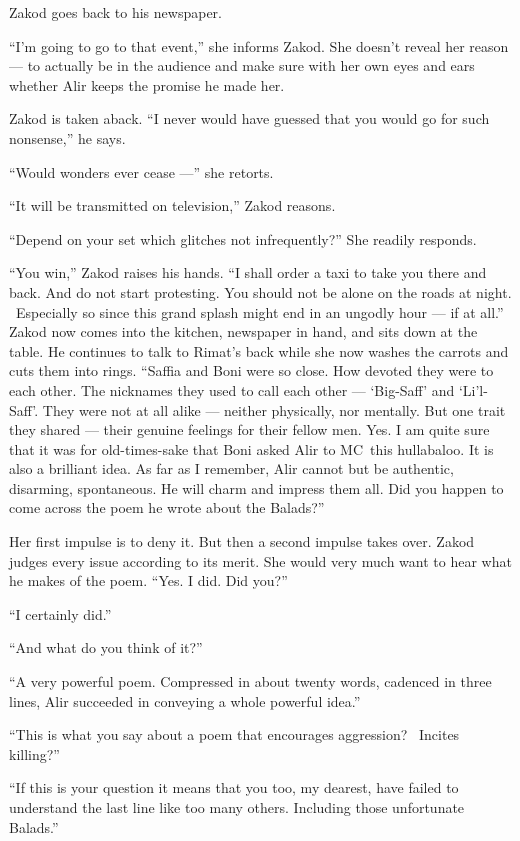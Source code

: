 \documentclass[twoside,11pt]{book}
\begin{document}
Zakod goes back to his newspaper.

``I'm going to go to that event,'' she informs Zakod. She doesn't reveal her reason --- to
actually be in the audience and make sure with her own eyes and ears whether Alir keeps  the promise he made
her.{ }

Zakod is taken aback. ``I never would have guessed that you would go for such nonsense,'' he says.

``Would wonders ever cease ---'' she retorts.

``It will be transmitted on television,'' Zakod reasons.

``Depend on your set which glitches not infrequently?'' She readily responds.

``You win,'' Zakod raises his hands. ``I shall order a taxi to take you there and
back. And do not start protesting. You should not be alone on the roads at night. ~Especially so since this grand
splash might end in an ungodly hour --- if at all.'' Zakod now comes into the kitchen, newspaper in hand,
and sits down at the table. He continues to talk to Rimat's back while she now washes the carrots and cuts them into
rings. ``Saffia and Boni were so close.  How devoted they were to each other{.}  The
nicknames they used to call each other --- `Big-Saff' and `Li'l-Saff'. They were not at all alike --- neither physically,
nor mentally. But one trait they shared --- their genuine feelings for their
fellow men. Yes. I am quite sure that it was for old-times-sake that Boni asked Alir to MC~this hullabaloo. It is
also a brilliant idea. As far as I remember, Alir cannot but be authentic, disarming, spontaneous. He will charm and
impress them all. Did you happen to come across the poem he wrote about the Balads?''

Her first impulse is to deny it. But then a second impulse takes over. Zakod judges every issue according to its merit.
She would very much want to hear what he makes of the poem. ``Yes. I did. Did you?''

``I certainly did.''

``And what do you think of it?''

``A very powerful poem. Compressed in about twenty words, cadenced in three lines, Alir succeeded in
conveying a whole powerful idea.''

``This is what you say about a poem that encourages aggression? ~Incites killing?''

``If this is your question it means that you too, my dearest, have failed to understand the last line like
too many others. Including those unfortunate Balads.''
\end{document}

